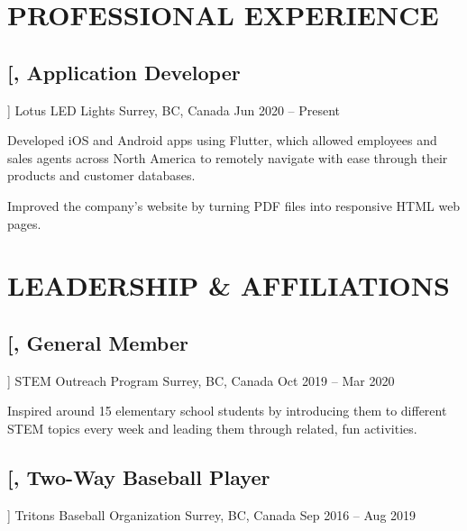 \documentclass{article}
\newcommand{\datedsubsection}[4][]{
    \subsection*{
        \textbf{\large #2}, #3 \hfill #4
    } %
    \vspace{-4pt} %
    #1 %
}
\begin{document}
{    %
    
    
    
    \section{PROFESSIONAL EXPERIENCE}
    
    
    \datedsubsection
        [\textit{Application Developer}]
        {Lotus LED Lights}
        {Surrey, BC, Canada}
        {Jun 2020 -- Present}
    
    \begin{compactitem}
    \item Developed iOS and Android apps using Flutter, which allowed employees and sales agents across North America to remotely navigate with ease through their products and customer databases.
    \item Improved the company's website by turning PDF files into responsive HTML web pages.
    \end{compactitem}
    
    
    
    
    \section{LEADERSHIP \& AFFILIATIONS}
    
    
    \datedsubsection
        [\textit{General Member}]
        {STEM Outreach Program}
        {Surrey, BC, Canada}
        {Oct 2019 -- Mar 2020}
    
    \begin{compactitem}
    \item Inspired around 15 elementary school students by introducing them to different STEM topics every week and leading them through related, fun activities.
    \end{compactitem}
    
    
    
    \datedsubsection
        [\textit{Two-Way Baseball Player}]
        {Tritons Baseball Organization}
        {Surrey, BC, Canada}
        {Sep 2016 -- Aug 2019}
    
}
\end{document}
